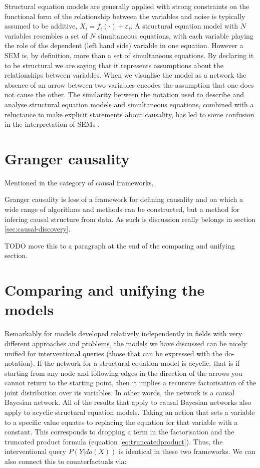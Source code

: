 \documentclass[11pt,a4paper,oneside]{book}
\theoremstyle{plain}
\theoremstyle{definition}
\let\epsilon\varepsilon
\begin{document}
Structural equation models are generally applied with strong constraints on the functional form of the relationship between the variables and noise is typically assumed to be additive, $X_i = f_i(\cdot)+\epsilon_i$. A structural equation model with $N$ variables resembles a set of $N$ simultaneous equations, with each variable playing the role of the dependent (left hand side) variable in one equation. However a SEM is, by definition, more than a set of simultaneous equations. By declaring it to be structural we are saying that it represents assumptions about the relationships between variables. When we visualise the model as a network the absence of an arrow between two variables encodes the assumption that one does not cause the other. The similarity between the notation used to describe and analyse structural equation models and simultaneous equations, combined with a reluctance to make explicit statements about causality, has led to some confusion in the interpretation of SEMs \citep{heckman2015causal,Pearl2000}. 

\section{Granger causality}

Mentioned in the category of causal frameworks,

Granger causality is less of a framework for defining causality and on which a wide range of algorithms and methods can be constructed, but a method for infering causal structure from data. As such is discussion really belongs in section \ref{sec:causal-discovery}.

TODO move this to a paragraph at the end of the comparing and unifying section. \todo{}


\section{Comparing and unifying the models}

Remarkably for models developed relatively independently in fields with very different approaches and problems, the models we have discussed can be nicely unified for interventional queries (those that can be expressed with the do-notation). If the network for a structural equation model is acyclic, that is if starting from any node and following edges in the direction of the arrows you cannot return to the starting point, then it implies a recursive factorisation of the joint distribution over its variables. In other words, the network is a causal Bayesian network. All of the results that apply to causal Bayesian networks also apply to acyclic structural equation models.  Taking an action that sets a variable to a specific value equates to replacing the equation for that variable with a constant. This corresponds to dropping a term in the factorisation and the truncated product formula (equation \ref{eq:truncatedproduct}). Thus, the interventional query $P(Y|do(X))$ is identical in these two frameworks. We can also connect this to counterfactuals via:
\end{document}
